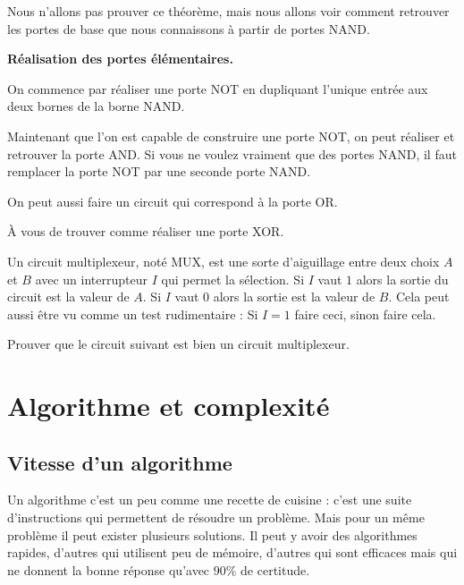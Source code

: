 \documentclass[11pt,class=report,crop=false]{standalone}
\begin{document}

Nous n'allons pas prouver ce théorème, mais nous allons voir comment retrouver les portes de base que nous connaissons à partir de portes NAND.
\medskip

\textbf{Réalisation des portes élémentaires.}

On commence par réaliser une porte NOT en dupliquant l'unique entrée aux deux bornes de la borne NAND.

Maintenant que l'on est capable de construire une porte NOT, on peut réaliser et retrouver la porte AND.
Si vous ne voulez vraiment que des portes NAND, il faut remplacer la porte NOT par une seconde porte NAND.

On peut aussi faire un circuit qui correspond à la porte OR.

À vous de trouver comme réaliser une porte XOR.


\begin{exercicecours}
Un circuit multiplexeur, noté MUX, est une sorte d'aiguillage entre deux choix $A$ et $B$ avec un interrupteur $I$ qui permet la sélection.
Si $I$ vaut $1$ alors la sortie du circuit est la valeur de $A$.
Si $I$ vaut $0$ alors la sortie est la valeur de $B$.
Cela peut aussi être vu comme un test rudimentaire : \og{}Si $I=1$ faire ceci, sinon faire cela.\fg{}

Prouver que le circuit suivant est bien un circuit multiplexeur.
\end{exercicecours}



\section{Algorithme et complexité}


\subsection{Vitesse d'un algorithme}

Un algorithme c'est un peu comme une recette de cuisine : c'est une suite d'instructions qui permettent de résoudre un problème.
Mais pour un même problème il peut exister plusieurs solutions. Il peut y avoir des algorithmes rapides, d'autres qui utilisent peu de mémoire,
d'autres qui sont efficaces mais qui ne donnent la bonne réponse qu'avec $90\%$ de certitude. 
\end{document}
